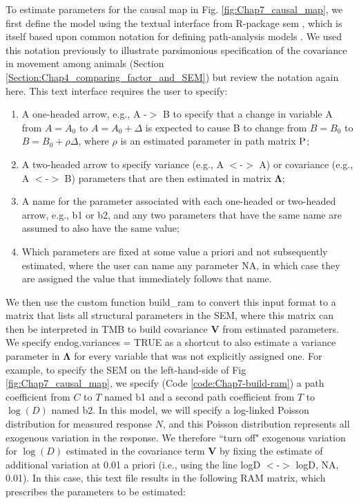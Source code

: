 To estimate parameters for the causal map in Fig. \ref{fig:Chap7_causal_map}, we first define the model using the textual interface from R-package \colorbox{backcolour}{sem} \cite{fox_sem_2020}, which is itself based upon common notation for defining path-analysis models \cite{wright_analysis_1934}.  We used this notation previously to illustrate parsimonious specification of the covariance in movement among animals (Section \ref{Section:Chap4_comparing_factor_and_SEM}) but review the notation again here.  This text interface requires the user to specify:
\begin{enumerate}
    \item A one-headed arrow, e.g., \colorbox{backcolour}{A -$>$ B} to specify that a change in variable A from \(A=A_0\) to \(A=A_0 + \Delta\) is expected to cause B to change from \(B=B_0\) to \(B = B_0 + \rho \Delta\), where \(\rho\) is an estimated parameter in path matrix \( \mathbf{\operatorname{P}} \);

    \item A two-headed arrow to specify variance (e.g., \colorbox{backcolour}{A $<$-$>$ A}) or covariance (e.g., \colorbox{backcolour}{A $<$-$>$ B}) parameters that are then estimated in matrix \( \mathbf{\Lambda} \);

    \item A name for the parameter associated with each one-headed or two-headed arrow, e.g., \colorbox{backcolour}{b1} or \colorbox{backcolour}{b2}, and any two parameters that have the same name are assumed to also have the same value;

    \item Which parameters are fixed at some value a priori and not subsequently estimated, where the user can name any parameter \colorbox{backcolour}{NA}, in which case they are assigned the value that immediately follows that name.
\end{enumerate}
We then use the custom function \colorbox{backcolour}{build\_ram} to convert this input format to a matrix that lists all structural parameters in the SEM, where this matrix can then be interpreted in TMB to build covariance \(\mathbf{V}\) from estimated parameters.  We specify \colorbox{backcolour}{endog$.$variances = TRUE } as a shortcut to also estimate a variance parameter in \( \mathbf{\Lambda} \) for every variable that was not explicitly assigned one.  For example, to specify the SEM on the left-hand-side of Fig \ref{fig:Chap7_causal_map}, we specify (Code \ref{code:Chap7-build-ram}) a path coefficient from \(C\) to \(T\) named \colorbox{backcolour}{b1} and a second path coefficient from \(T\) to \(\log(D)\) named \colorbox{backcolour}{b2}. In this model, we will specify a log-linked Poisson distribution for measured response \(N\), and this Poisson distribution represents all exogenous variation in the response.  We therefore ``turn off" exogenous variation for \(\log(D)\) estimated in the covariance term \(\mathbf{V}\) by fixing the estimate of additional variation at 0.01 a priori (i.e., using the line \colorbox{backcolour}{logD $<$-$>$ logD, NA, 0.01}).  In this case, this text file results in the following RAM matrix, which prescribes the parameters to be estimated:

